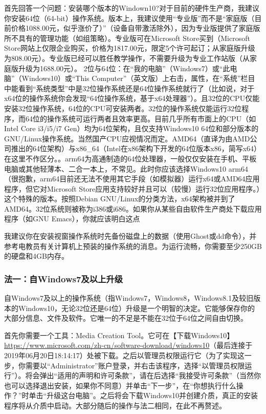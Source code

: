 首先回答一个问题：安装哪个版本的Windown10?对于目前的硬件生产商，我建议你安装64位（64-bit）操作系统。版本上，我建议使用“专业版”而不是“家庭版（目前价格1088.00元，似乎涨价了）”（设备自带激活除外），因为专业版提供了家庭版所不具有的管理功能（如组策略）。专业版可在Microsoft Store买到（Microsoft Store网站上仅限企业购买，价格为1817.00元，限定5个许可起订；从家庭版升级为808.00元）。专业版已经可以胜任教学操作，不需要升级为专业工作站版（从家庭版升级为1688.00元）。 2位与64位：在“我的电脑”（Windows7）或“此电脑”（Windows10）或“This Computer”（英文版）上右击，属性，在“系统”栏目中能看到“系统类型”中是32位操作系统还是64位操作系统就行了（比如说，对于x64位的操作系统你会发现“64位操作系统，基于x64处理器”）。且32位的CPU仅能安装32位操作系统，64位的CPU可安装两者。32位的操作系统仅能运行32位程序，而64位的操作系统可运行两者且效率更高。目前几乎所有市面上的CPU（如Intel Core i3/i5/i7  Gen）均为64位架构，且仅支持Windows10 64位和部分版本的GNU/Linux操作系统。当然国产CPU应视情况而定。AMD64（直译为由AMD公司推出的64位架构）与x86\_64（Intel在x86架构下开发的64位版本x86，简写x64）在这里不作区分。。arm64为高通制造的64位处理器，一般仅仅安装在手机、平板电脑或其他轻薄本、二合一本上，不常见。此时你应该选择Windows10 arm64（很抱歉，arm64目前还无法不使用其它手段（如模拟器）运行x64或AMD64应用程序，但它对Microsoft Store应用支持较好并且可以（较慢）运行32位应用程序。）这个特殊的版本。按照Debian GNU/Linux的分类方法，x64架构被并到了AMD64。32位系统则被称为i386或i686。如果你从某些自由软件生产商处下载应用程序（如GNU Emacs），你就应该明白这点\par
\begin{center} \bf \large {\color{red}{警告！即使使用微软提供的映像，第三方安装工具也可能会向计算机注入病毒或安装用户不需要的软件！因此请尽量不要使用非官方的工具来安装系统！}}\end{center}\par
我建议你在安装视窗操作系统时先备份磁盘上的数据（使用Ghost或dd命令），并参考电教员有关计算机上预装的操作系统的消息。为运行流畅，你需要至少250GB的硬盘和4GB内存。
\subsubsection{法一：自Windows7及以上升级}
自Windows7及以上的操作系统（指Windows7，Windows8，Windows8.1及较旧版本的Windows10，无论32位还是64位）升级是一个明智的决定。它能够保存你的大部分信息、文件及软件。它唯一的不足是不能在32位于64位之间自由切换。\par
首先你需要一个工具：Media Creation Tool。它可在【下载Windows10】\url{https://www.microsoft.com/zh-cn/software-download/windows10}（最后连接于2019年06月20日18:14:17）处被下载。之后以管理员权限运行它（为了实现这一步，你需要以“Administrator”账户登录，并右击该程序，选择“以管理员权限运行”）。将会弹出“适用的声明和许可条款”，请在{\color{red}{仔细阅读}}后选择“我接受许可条款”（当然你也可以选择退出安装，如果你不同意）并单击“下一步”，在“你想执行什么操作？”时单击“升级这台电脑”。之后将会下载Windows10并创建介质，真正的安装程序将从介质中启动。大部分随后的操作与法二相同，在此不再赘述。
